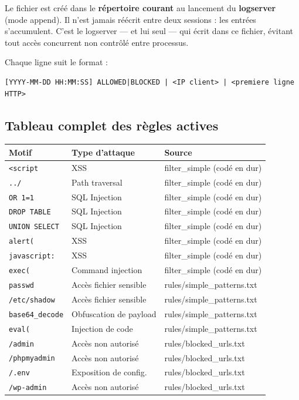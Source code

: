 \documentclass[12pt,a4paper]{article}
\begin{document}
Le fichier est créé dans le \textbf{répertoire courant} au lancement du \textbf{logserver} (mode append). Il n'est jamais réécrit entre deux sessions : les entrées s'accumulent. C'est le logserver --- et lui seul --- qui écrit dans ce fichier, évitant tout accès concurrent non contrôlé entre processus.

Chaque ligne suit le format :

\begin{lstlisting}[style=monospace]
[YYYY-MM-DD HH:MM:SS] ALLOWED|BLOCKED | <IP client> | <premiere ligne HTTP>
\end{lstlisting}

\subsection{Tableau complet des règles actives}

\begin{tabularx}{\linewidth}{llX}
  \toprule
  \textbf{Motif} & \textbf{Type d'attaque} & \textbf{Source} \\
  \midrule
  \texttt{<script}        & XSS                    & filter\_simple (codé en dur) \\
  \texttt{../}            & Path traversal         & filter\_simple (codé en dur) \\
  \texttt{OR 1=1}         & SQL Injection          & filter\_simple (codé en dur) \\
  \texttt{DROP TABLE}     & SQL Injection          & filter\_simple (codé en dur) \\
  \texttt{UNION SELECT}   & SQL Injection          & filter\_simple (codé en dur) \\
  \texttt{alert(}         & XSS                    & filter\_simple (codé en dur) \\
  \texttt{javascript:}    & XSS                    & filter\_simple (codé en dur) \\
  \texttt{exec(}          & Command injection      & filter\_simple (codé en dur) \\
  \texttt{passwd}         & Accès fichier sensible & rules/simple\_patterns.txt \\
  \texttt{/etc/shadow}    & Accès fichier sensible & rules/simple\_patterns.txt \\
  \texttt{base64\_decode} & Obfuscation de payload & rules/simple\_patterns.txt \\
  \texttt{eval(}          & Injection de code      & rules/simple\_patterns.txt \\
  \texttt{/admin}         & Accès non autorisé     & rules/blocked\_urls.txt \\
  \texttt{/phpmyadmin}    & Accès non autorisé     & rules/blocked\_urls.txt \\
  \texttt{/.env}          & Exposition de config.  & rules/blocked\_urls.txt \\
  \texttt{/wp-admin}      & Accès non autorisé     & rules/blocked\_urls.txt \\
  \bottomrule
\end{tabularx}
\end{document}
